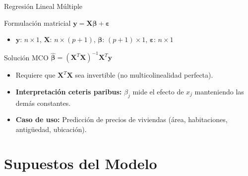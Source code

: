 \documentclass[aspectratio=169, 10pt, xcolor=table]{beamer}
\begin{document}
\begin{frame}{Regresión Lineal Múltiple}
    \begin{block}{Formulación matricial}
        $\mathbf{y} = \mathbf{X}\boldsymbol{\beta} + \boldsymbol{\varepsilon}$
        \begin{itemize}
            \item $\mathbf{y}$: $n \times 1$, $\mathbf{X}$: $n \times (p+1)$, $\boldsymbol{\beta}$: $(p+1) \times 1$, $\boldsymbol{\varepsilon}$: $n \times 1$
        \end{itemize}
    \end{block}
    \begin{exampleblock}{Solución MCO}
        $\hat{\boldsymbol{\beta}} = (\mathbf{X}^T\mathbf{X})^{-1}\mathbf{X}^T\mathbf{y}$
        \begin{itemize}
            \item Requiere que $\mathbf{X}^T\mathbf{X}$ sea invertible (no multicolinealidad perfecta).
        \end{itemize}
    \end{exampleblock}
    \begin{itemize}
        \item \textbf{Interpretación ceteris paribus:} $\beta_j$ mide el efecto de $x_j$ manteniendo las demás constantes.
        \item \textbf{Caso de uso:} Predicción de precios de viviendas (área, habitaciones, antigüedad, ubicación).
    \end{itemize}
\end{frame}

\section{Supuestos del Modelo}
\end{document}

